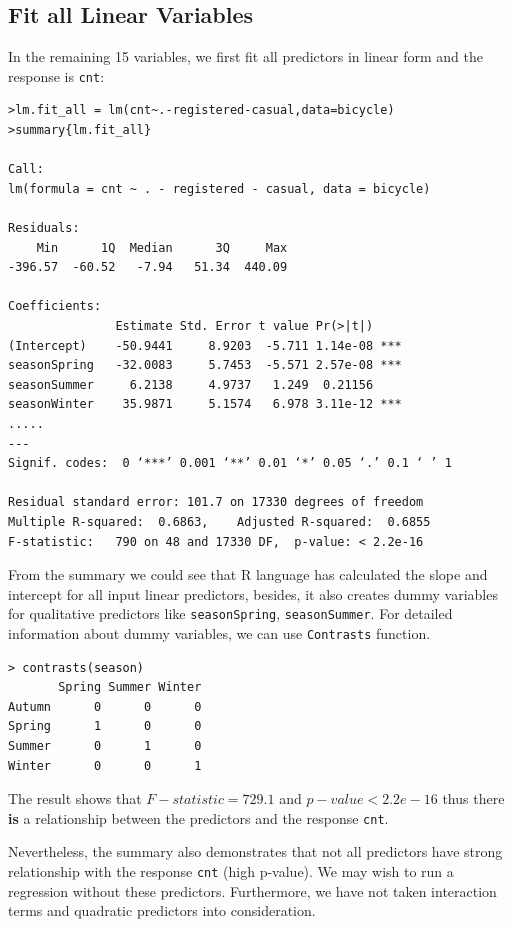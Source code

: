 \subsection{Fit all Linear Variables}
\label{sec:fitall}
In the remaining 15 variables, we first fit all predictors in linear form and the response is \texttt{cnt}:
\begin{lstlisting}[style=rlanguage]
>lm.fit_all = lm(cnt~.-registered-casual,data=bicycle)
>summary{lm.fit_all}

Call:
lm(formula = cnt ~ . - registered - casual, data = bicycle)

Residuals:
    Min      1Q  Median      3Q     Max
-396.57  -60.52   -7.94   51.34  440.09

Coefficients:
               Estimate Std. Error t value Pr(>|t|)
(Intercept)    -50.9441     8.9203  -5.711 1.14e-08 ***
seasonSpring   -32.0083     5.7453  -5.571 2.57e-08 ***
seasonSummer     6.2138     4.9737   1.249  0.21156
seasonWinter    35.9871     5.1574   6.978 3.11e-12 ***
.....
---
Signif. codes:  0 ‘***’ 0.001 ‘**’ 0.01 ‘*’ 0.05 ‘.’ 0.1 ‘ ’ 1

Residual standard error: 101.7 on 17330 degrees of freedom
Multiple R-squared:  0.6863,	Adjusted R-squared:  0.6855
F-statistic:   790 on 48 and 17330 DF,  p-value: < 2.2e-16
\end{lstlisting}
From the summary we could see that R language has calculated the slope and intercept for all input linear predictors, besides, it also creates dummy variables for qualitative predictors like \texttt{seasonSpring}, \texttt{seasonSummer}. For detailed information about dummy variables, we can use \texttt{Contrasts} function.

\begin{lstlisting}[style=rlanguage]
> contrasts(season)
       Spring Summer Winter
Autumn      0      0      0
Spring      1      0      0
Summer      0      1      0
Winter      0      0      1
\end{lstlisting}

The result shows that $F-statistic = 729.1$ and $p-value < 2.2e-16$ thus there \textbf{is} a relationship between the predictors and the response \texttt{cnt}.

Nevertheless, the summary also demonstrates that not all predictors have strong relationship with the response \texttt{cnt} (high p-value). We may wish to run a regression without these predictors. Furthermore, we have not taken interaction terms and quadratic predictors into consideration.

